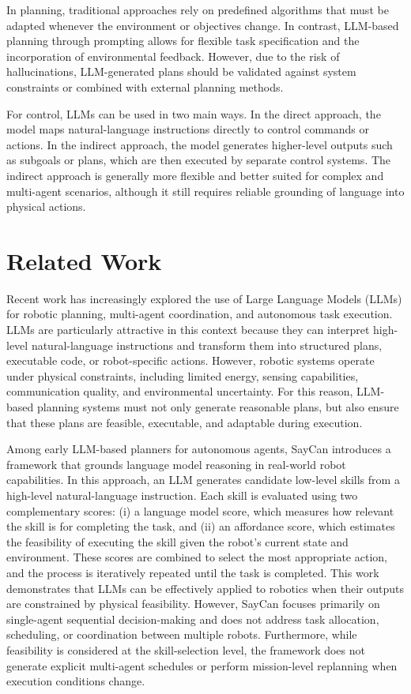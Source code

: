 In planning, traditional approaches rely on predefined algorithms that must be adapted whenever the environment or objectives change. 
In contrast, LLM-based planning through prompting allows for flexible task specification and the incorporation of environmental feedback. 
However, due to the risk of hallucinations, LLM-generated plans should be validated against system constraints or combined with external planning methods.

For control, LLMs can be used in two main ways. 
In the direct approach, the model maps natural-language instructions directly to control commands or actions. 
In the indirect approach, the model generates higher-level outputs such as subgoals or plans, which are then executed by separate control systems. 
The indirect approach is generally more flexible and better suited for complex and multi-agent scenarios, 
although it still requires reliable grounding of language into physical actions.

\section{Related Work}

Recent work has increasingly explored the use of Large Language Models (LLMs) for robotic planning, 
multi-agent coordination, and autonomous task execution. 
LLMs are particularly attractive in this context because they can interpret high-level natural-language instructions 
and transform them into structured plans, executable code, or robot-specific actions. 
However, robotic systems operate under physical constraints, including limited energy, sensing capabilities, 
communication quality, and environmental uncertainty. 
For this reason, LLM-based planning systems must not only generate reasonable plans, 
but also ensure that these plans are feasible, executable, and adaptable during execution.

Among early LLM-based planners for autonomous agents, 
SayCan \cite{ahn2022doasican} introduces a framework that grounds language model reasoning in real-world robot capabilities.
In this approach, an LLM generates candidate low-level skills from a high-level natural-language instruction.
Each skill is evaluated using two complementary scores: (i) a language model score, which measures how relevant the skill is for completing the task, and (ii) an affordance score, which estimates the feasibility of executing the skill given the robot's current state and environment.
These scores are combined to select the most appropriate action, and the process is iteratively repeated until the task is completed.
This work demonstrates that LLMs can be effectively applied to robotics when their outputs are constrained by physical feasibility.
However, SayCan focuses primarily on single-agent sequential decision-making and does not address task allocation, scheduling, 
or coordination between multiple robots.
Furthermore, while feasibility is considered at the skill-selection level, the framework does not generate explicit multi-agent 
schedules or perform mission-level replanning when execution conditions change.

